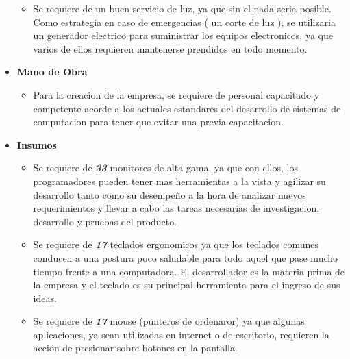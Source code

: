 \documentclass[
10pt, %
a4paper, %
oneside, %
headinclude,footinclude, %
BCOR5mm, %
]{scrartcl}
\begin{document}
\begin{itemize}
\begin{itemize}
    \item Se requiere de un buen servicio de luz, ya que sin el nada seria
            posible. Como estrategia en caso de emergencias ( un corte de luz ),
            se utilizaria un generador electrico para suministrar los
            equipos electronicos, ya que varios de ellos requieren mantenerse
            prendidos en todo momento.
  \end{itemize}

  \item \textbf {Mano de Obra}
  \begin{itemize}
    \item Para la creacion de la empresa, se requiere de personal capacitado y
            competente acorde a los actuales estandares del desarrollo de sistemas
            de computacion para tener que evitar una previa capacitacion.
  \end{itemize}


  \item \textbf {Insumos}
  \begin{itemize}
    \item Se requiere de \emph { \textbf{33} } monitores de alta gama,
            ya que con ellos, los programadores pueden tener mas herramientas
            a la vista y agilizar su desarrollo tanto como su desempeño a la
            hora de analizar nuevos requerimientos y llevar a cabo las tareas
            necesarias de investigacion, desarrollo y pruebas del producto.
    \item Se requiere de \emph { \textbf{17} } teclados ergonomicos
            ya que los teclados comunes conducen a una postura poco saludable
            para todo aquel que pase mucho tiempo frente a una computadora.
            El desarrollador es la materia prima de la empresa y el teclado
            es su principal herramienta para el ingreso de sus ideas.
    \item Se requiere de \emph { \textbf{17} } mouse (punteros de ordenaror)
            ya que algunas aplicaciones, ya sean utilizadas en internet o de
            escritorio, requieren la accion de presionar sobre botones en la
            pantalla.
\pagebreak


\end{itemize}
\end{itemize}
\end{document}
